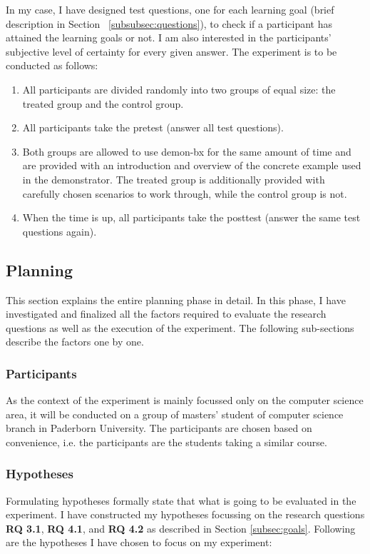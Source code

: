 In my case, I have designed test questions, one for each learning goal (brief description in Section~ \ref{subsubsec:questions}), to check if a participant has attained the learning goals or not. I am also interested in the participants' subjective level of certainty for every given answer. The experiment is to be conducted as follows:

\begin{enumerate}
	\item All participants are divided randomly into two groups of equal size: the treated group and the control group.
	\item All participants take the pretest (answer all test questions).
	\item Both groups are allowed to use demon-bx for the same amount of time and are provided with an introduction and overview of the concrete example used in the demonstrator.
	The treated group is additionally provided with carefully chosen scenarios to work through, while the control group is not.
	\item When the time is up, all participants take the posttest (answer the same test questions again).
\end{enumerate}

\subsection{Planning}\label{subsec:planning}
This section explains the entire planning phase in detail. In this phase, I have investigated and  finalized all the factors required to evaluate the research questions as well as the execution of the experiment. The following sub-sections describe the factors one by one.

\subsubsection{Participants}\label{subsubsec:participants}
As the context of the experiment is mainly focussed only on the computer science area, it will be conducted on a group of masters' student of computer science branch in Paderborn University. The participants are chosen based on convenience, i.e. the participants are the students taking a similar course.

\subsubsection{Hypotheses}\label{subsubsec:hypotheses}
Formulating hypotheses formally state that what is going to be evaluated in the experiment. I have constructed my hypotheses focussing on the research questions \textbf{RQ 3.1}, \textbf{RQ 4.1}, and  \textbf{RQ 4.2} as described in Section \ref{subsec:goals}. Following are the hypotheses I have chosen to focus on my experiment:\\

